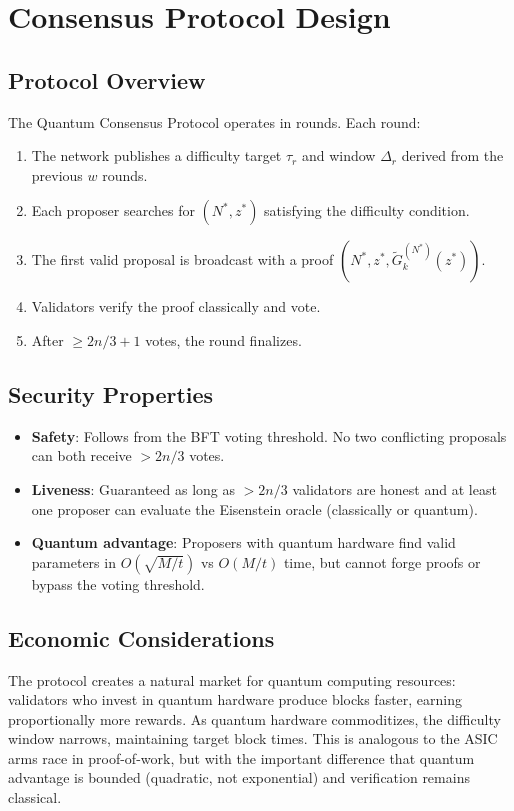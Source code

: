 \section{Consensus Protocol Design}


\subsection{Protocol Overview}

The Quantum Consensus Protocol operates in rounds. Each round:

\begin{enumerate}[nosep]
  \item The network publishes a difficulty target $\tau_r$ and window
        $\Delta_r$ derived from the previous $w$ rounds.
  \item Each proposer searches for $(N^*, z^*)$ satisfying the
        difficulty condition.
  \item The first valid proposal is broadcast with a proof
        $(N^*, z^*, \tilde{G}_k^{(N^*)}(z^*))$.
  \item Validators verify the proof classically and vote.
  \item After $\geq 2n/3 + 1$ votes, the round finalizes.
\end{enumerate}

\subsection{Security Properties}

\begin{itemize}[nosep]
  \item \textbf{Safety}: Follows from the BFT voting threshold. No two
        conflicting proposals can both receive $> 2n/3$ votes.
  \item \textbf{Liveness}: Guaranteed as long as $> 2n/3$ validators
        are honest and at least one proposer can evaluate the Eisenstein
        oracle (classically or quantum).
  \item \textbf{Quantum advantage}: Proposers with quantum hardware find
        valid parameters in $O(\sqrt{M/t})$ vs $O(M/t)$ time, but cannot
        forge proofs or bypass the voting threshold.
\end{itemize}

\subsection{Economic Considerations}

The protocol creates a natural market for quantum computing resources:
validators who invest in quantum hardware produce blocks faster,
earning proportionally more rewards. As quantum hardware commoditizes,
the difficulty window narrows, maintaining target block times. This is
analogous to the ASIC arms race in proof-of-work, but with the
important difference that quantum advantage is bounded (quadratic, not
exponential) and verification remains classical.

